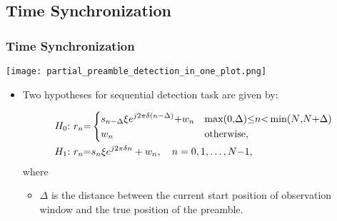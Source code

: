 \subsection{Time Synchronization}

\begin{frame}
    \frametitle{Time Synchronization}

    \begin{center}
      \texttt{[image: partial\_preamble\_detection\_in\_one\_plot.png]}
    \end{center}

    \begin{itemize}
      \item Two hypotheses for sequential detection task are given by:
      
      \begin{equation*}
        \label{eq:two hypotheses}
        \begin{aligned}
        &H_0{:}~r_n{=}
        \begin{dcases}
            s_{n-\Delta}\xi e^{j2\pi\delta (n-\Delta)}{+}w_n & \max(0{,}\Delta){\leq} n {<} \min(N{,}N{+}\Delta) \\
            w_n & \text{otherwise},
        \end{dcases} \\
        &H_1{:}~r_n{=}s_n\xi e^{j2\pi\delta n}+w_n, \quad n = 0,1,\ldots,N{-}1,
        \end{aligned}
      \end{equation*}
      where
      
      \begin{itemize}
          \item $\Delta$ is the distance between the current start position of observation window and the true position of the preamble.
      \end{itemize}

    \end{itemize} 

\end{frame}


